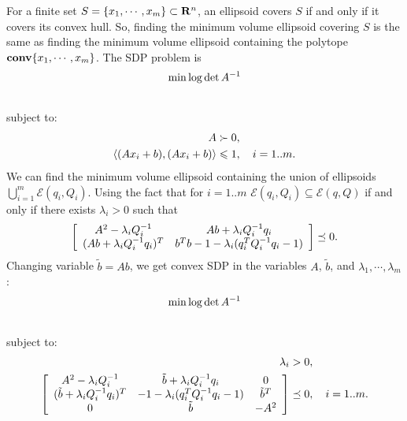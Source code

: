 \documentclass[letterpaper,10pt,english]{sphinxmanual}
\begin{document}
For a finite set $S=\{x_1,\cdots,x_m\}\subset{\bf R}^n$, an
ellipsoid covers $S$ if and only if it covers its convex hull. So,
finding the minimum volume ellipsoid covering $S$ is the same as
finding the minimum volume ellipsoid containing the polytope
${\bf conv}\{x_1,\cdots,x_m\}$. The SDP problem is
\begin{gather}
\begin{split}\min \log \det A^{-1}\end{split}\notag\\\begin{split}\end{split}\notag
\end{gather}
subject to:
\begin{gather}
\begin{split}\begin{aligned}
A & \succ  0, \\
\langle (Ax_i + b), (Ax_i + b)\rangle & \leqslant 1, ~~~ i=1..m.\end{aligned}\end{split}\notag
\end{gather}
We can find the minimum volume ellipsoid containing the union of
ellipsoids $\bigcup_{i=1}^m{\mathcal E}(q_i,Q_i)$. Using the fact
that for $i=1..m$
${\mathcal E}(q_i,Q_i)\subseteq{\mathcal E}(q,Q)$ if and only if
there exists $\lambda_i>0$ such that
\begin{gather}
\begin{split}\left[\begin{array}{cc}
A^2 - \lambda_i Q_i^{-1} & Ab + \lambda_i Q_i^{-1}q_i\\
(Ab + \lambda_i Q_i^{-1}q_i)^T & b^Tb-1 - \lambda_i (q_i^TQ_i^{-1}q_i-1) \end{array}
\right] \preceq 0 .\end{split}\notag
\end{gather}
Changing variable $\tilde{b}=Ab$, we get convex SDP in the
variables $A$, $\tilde{b}$, and
$\lambda_1,\cdots,\lambda_m$:
\begin{gather}
\begin{split}\min \log \det A^{-1}\end{split}\notag\\\begin{split}\end{split}\notag
\end{gather}
subject to:
\begin{gather}
\begin{split}\begin{aligned}
\lambda_i & > 0,\\
\left[\begin{array}{ccc}
A^2-\lambda_iQ_i^{-1} & \tilde{b}+\lambda_iQ_i^{-1}q_i & 0 \\
(\tilde{b}+\lambda_iQ_i^{-1}q_i)^T & -1-\lambda_i(q_i^TQ_i^{-1}q_i-1) & \tilde{b}^T \\
0 & \tilde{b} & -A^2\end{array}\right] & \preceq 0, ~~~ i=1..m.\end{aligned}\end{split}\notag
\end{gather}
\end{document}
